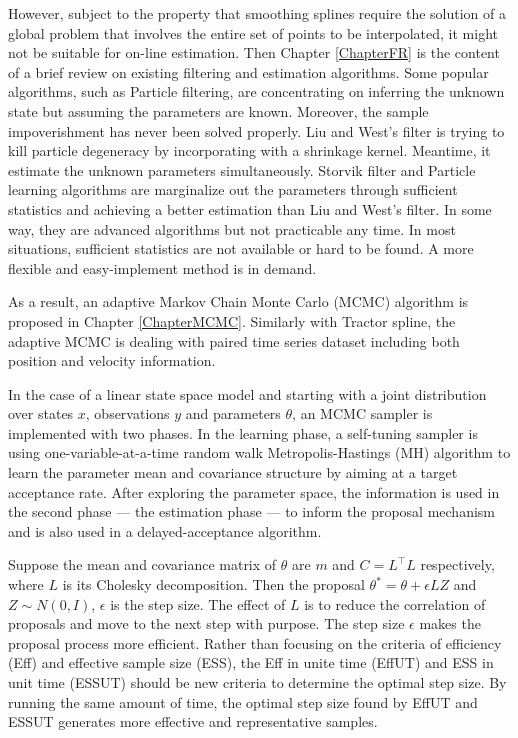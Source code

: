 However, subject to the property that smoothing splines require the solution of a global problem that involves the entire set of points to be interpolated, it might not be suitable for on-line estimation. Then Chapter \ref{ChapterFR} is the content of a brief review on existing filtering and estimation algorithms. Some popular algorithms, such as Particle filtering, are concentrating on inferring the unknown state but assuming the parameters are known. Moreover, the sample impoverishment has never been solved properly. Liu and West's filter is trying to kill particle degeneracy by incorporating with a shrinkage kernel. Meantime, it estimate the unknown parameters simultaneously. Storvik filter and Particle learning algorithms are marginalize out the parameters through sufficient statistics and achieving a better estimation than Liu and West's filter. In some way, they are advanced algorithms but not practicable any time. In most situations, sufficient statistics are not available or hard to be found. A more flexible and easy-implement method is in demand. 
 

As a result, an adaptive Markov Chain Monte Carlo (MCMC) algorithm is proposed in Chapter \ref{ChapterMCMC}. Similarly with Tractor spline, the adaptive MCMC is dealing with paired time series dataset including both position and velocity information. 


In the case of a linear state space model and starting with a joint distribution over states $x$, observations $y$ and parameters $\theta$, an MCMC sampler is implemented with two phases. In the learning phase, a self-tuning sampler is using one-variable-at-a-time random walk Metropolis-Hastings (MH) algorithm to learn the parameter mean and covariance structure by aiming at a target acceptance rate. After exploring the parameter space, the information is used in the second phase --- the estimation phase --- to inform the proposal mechanism and is also used in a delayed-acceptance algorithm. 


Suppose the mean and covariance matrix of $\theta$ are $m$ and $C=L^\top L$ respectively, where $L$ is its Cholesky decomposition. Then the proposal $\theta^*=\theta + \epsilon LZ$ and $Z\sim N(0,I)$, $\epsilon$ is the step size. The effect of $L$ is to reduce the correlation of proposals and move to the next step with purpose. The step size $\epsilon$ makes the proposal process more efficient. Rather than focusing on the criteria of efficiency (Eff) and effective sample size (ESS), the Eff in unite time (EffUT) and ESS in unit time (ESSUT) should be new criteria to determine the optimal step size. By running the same amount of time, the optimal step size found by EffUT and ESSUT generates more effective and representative samples. 


